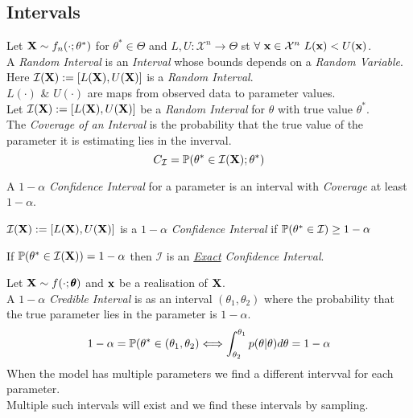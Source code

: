 \documentclass[11pt,a4paper]{article}
\begin{document}
\subsection{Intervals}

Let $\textbf{X}\sim f_n(\cdot;\theta^*)$ for $\theta^*\in\Theta$ and $L,U:\mathcal{X}^n\to\Theta$ st $\forall\ \x\in\mathcal{X}^n\ L(\x)<U(\x)$.\\
A \textit{Random Interval} is an \textit{Interval} whose bounds depends on a \textit{Random Variable}.\\
Here $\mathcal{I}(\textbf{X}):=[L(\textbf{X}),U(\textbf{X})]$ is a \textit{Random Interval}.\\
\nb $L(\cdot)$ \& $U(\cdot)$ are maps from observed data to parameter values.\\

Let $\mathcal{I}(\textbf{X}):=[L(\textbf{X}),U(\textbf{X})]$ be a \textit{Random Interval} for $\theta$ with true value $\theta^*$.\\
The \textit{Coverage of an Interval} is the probability that the true value of the parameter it is estimating lies in the inverval.
$$C_\mathcal{I}=\mathbb{P}(\theta^*\in\mathcal{I}(\textbf{X});\theta^*)$$

A $1-\alpha$ \textit{Confidence Interval} for a parameter is an interval with \textit{Coverage} at least $1-\alpha$.
\begin{center}
$\mathcal{I}(\textbf{X}):=[L(\textbf{X}),U(\textbf{X})]$ is a $1-\alpha$ \textit{Confidence Interval} if $\mathbb{P}(\theta^*\in\mathcal{I})\geq1-\alpha$
\end{center}
\nb If $\mathbb{P}(\theta^*\in\mathcal{I}(\textbf{X}))=1-\alpha$ then $\mathcal{I}$ is an \textit{\underline{Exact} Confidence Interval}.\\


Let $\textbf{X}\sim f(\cdot;\pmb\theta)$ and $\textbf{x}$ be a realisation of $\textbf{X}$.\\
A $1-\alpha$ \textit{Credible Interval} is as an interval $(\theta_1,\theta_2)$ where the probability that the true parameter lies in the parameter is $1-\alpha$.
$$1-\alpha=\mathbb{P}(\theta^*\in(\theta_1,\theta_2)\Longleftrightarrow\int^{\theta_1}_{\theta_2}p(\theta|\theta)d\theta=1-\alpha$$
When the model has multiple parameters we find a different intervval for each parameter.\\
\nb Multiple such intervals will exist and we find these intervals by sampling.\\
\end{document}

